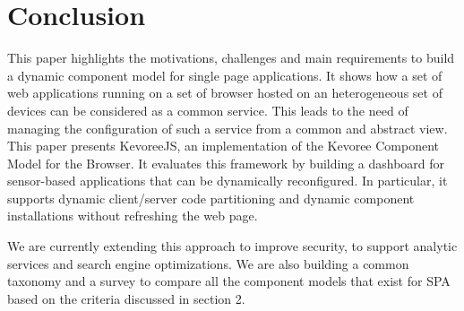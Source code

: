 \section{Conclusion}
This paper highlights the motivations, challenges and main requirements to build a dynamic component model for single page applications. It shows how a set of web applications running on a set of browser hosted on an heterogeneous set of devices can be considered as a common service. This leads to the need of managing the configuration of such a service from a common and abstract view. This paper presents KevoreeJS, an implementation of the Kevoree Component Model for the Browser. It evaluates this framework by building a dashboard for sensor-based applications that can be dynamically reconfigured. In particular, it supports dynamic client/server code partitioning and dynamic component installations without refreshing the web page.

We are currently extending this approach to improve security, to support analytic services and search engine optimizations. We are also building a common taxonomy and a survey to compare all the component models that exist for SPA based on the criteria discussed in section 2.
